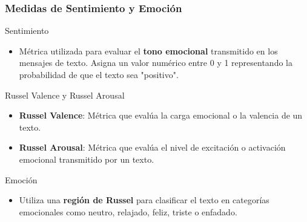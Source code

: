 \documentclass{beamer}
\begin{document}
\begin{frame}
	\frametitle{Medidas de Sentimiento y Emoción}
	\begin{block}{Sentimiento}
		\begin{itemize}
			\item Métrica utilizada para evaluar el \textbf{tono emocional} transmitido en los mensajes de texto. Asigna un valor numérico entre 0 y 1 representando la probabilidad de que el texto sea "positivo".
		\end{itemize}
	\end{block}
	
	\begin{block}{Russel Valence y Russel Arousal}
		\begin{itemize}
			\item \textbf{Russel Valence}: Métrica que evalúa la carga emocional o la valencia de un texto.
			\item \textbf{Russel Arousal}: Métrica que evalúa el nivel de excitación o activación emocional transmitido por un texto.
		\end{itemize}
	\end{block}
	
	\begin{block}{Emoción}
		\begin{itemize}
			\item Utiliza una \textbf{región de Russel} para clasificar el texto en categorías emocionales como neutro, relajado, feliz, triste o enfadado.
		\end{itemize}
	\end{block}
	
\end{frame}
\end{document}
